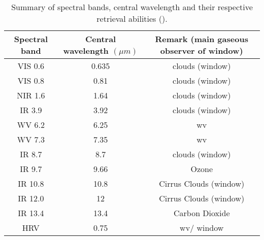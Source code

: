 \begin{table}[ht]
    \centering
    \setlength\extrarowheight{-7pt}
    \begin{tabular}{c|c|c}
        Spectral band & Central wavelength $\left( \mu m  \right)$ & Remark \newline 
        (main gaseous observer of window) \\ \hline
        VIS 0.6 & 0.635 & clouds (window)    \\
        VIS 0.8 & 0.81  & clouds (window)     \\
        NIR 1.6 & 1.64  & clouds (window)    \\
        IR 3.9 & 3.92  & clouds  (window)     \\
        WV 6.2 & 6.25 & \acrlong{wv}  \\
        WV 7.3 & 7.35 & \acrlong{wv}  \\ 
        IR 8.7 & 8.7 &   clouds  (window)       \\
        IR 9.7 & 9.66 & Ozone        \\
        IR 10.8 & 10.8 & Cirrus Clouds (window)  \\
        IR 12.0 & 12 & Cirrus Clouds (window) \\
        IR 13.4 & 13.4 & Carbon Dioxide  \\
        HRV & 0.75 & \acrlong{wv}/ window 
    \end{tabular}
    \caption{Summary of spectral bands, central wavelength and their respective retrieval abilities (\cite{Schmetz_meteosat_intro}).}
    \label{tab:msg_spectral_bands}
\end{table}